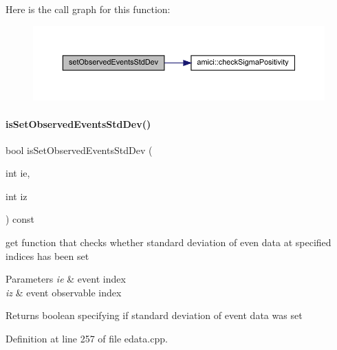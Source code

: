 Here is the call graph for this function\+:
\nopagebreak
\begin{figure}[H]
\begin{center}
\leavevmode
\includegraphics[width=350pt]{classamici_1_1_exp_data_a2533798d195c8ede07c783800adf1d82_cgraph}
\end{center}
\end{figure}
\mbox{\label{classamici_1_1_exp_data_a29530529cf50b9fa791e02fed620ea7a}} 
\paragraph{\texorpdfstring{isSetObservedEventsStdDev()}{isSetObservedEventsStdDev()}}
{\footnotesize\ttfamily bool is\+Set\+Observed\+Events\+Std\+Dev (\begin{DoxyParamCaption}\item[{int}]{ie,  }\item[{int}]{iz }\end{DoxyParamCaption}) const}

get function that checks whether standard deviation of even data at specified indices has been set


\begin{DoxyParams}{Parameters}
{\em ie} & event index \\
\hline
{\em iz} & event observable index \\
\hline
\end{DoxyParams}
\begin{DoxyReturn}{Returns}
boolean specifying if standard deviation of event data was set 
\end{DoxyReturn}


Definition at line 257 of file edata.\+cpp.

